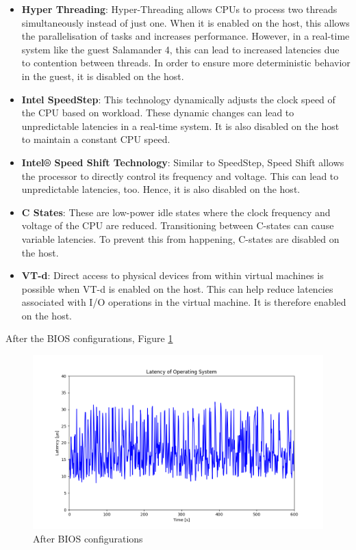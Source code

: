 \documentclass[MMR,Master,english]{twbook}
\begin{document}
	\begin{itemize}
		\item \textbf{Hyper Threading}: Hyper-Threading allows CPUs to process two threads simultaneously instead of just one. When it is enabled on the host, this allows the parallelisation of tasks and increases performance. However, in a real-time system like the guest Salamander 4, this can lead to increased latencies due to contention between threads. In order to ensure more deterministic behavior in the guest, it is disabled on the host.
		\item \textbf{Intel SpeedStep}: This technology dynamically adjusts the clock speed of the CPU based on workload. These dynamic changes can lead to unpredictable latencies in a real-time system. It is also disabled on the host to maintain a constant CPU speed.
		\item \textbf{Intel® Speed Shift Technology}: Similar to SpeedStep, Speed Shift allows the processor to directly control its frequency and voltage. This can lead to unpredictable latencies, too. Hence, it is also disabled on the host.
		\item \textbf{C States}: These are low-power idle states where the clock frequency and voltage of the CPU are reduced. Transitioning between C-states can cause variable latencies. To prevent this from happening, C-states are disabled on the host.
		\item \textbf{VT-d}: Direct access to physical devices from within virtual machines is possible when VT-d is enabled on the host. This can help reduce latencies associated with I/O operations in the virtual machine. It is therefore enabled on the host.
	\end{itemize}


After the BIOS configurations, Figure \ref{fig:max_latency_rt}

\begin{figure}[H]
	\centering
	\includegraphics[width=1.0\columnwidth]{masterthesis-documentation/docs/sigmatek/xenomai/3rt/max_latency_rt/max_latency_rt.png}
	\caption[After BIOS configurations]{After BIOS configurations}
	\label{fig:max_latency_rt}
\end{figure}
\end{document}
